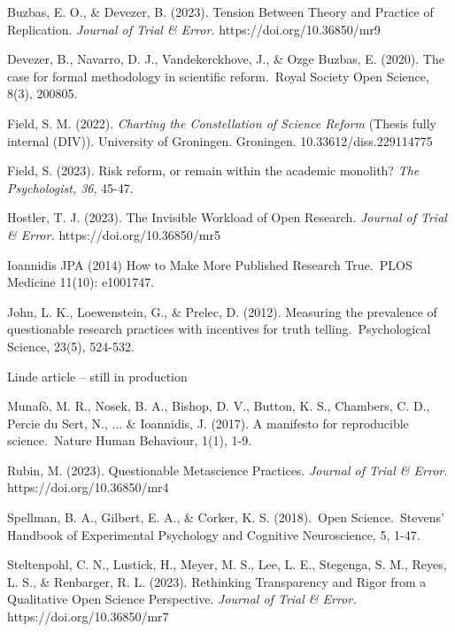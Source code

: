 \documentclass[authordate, editorial,noabstract]{jote-new-article}
\begin{document}
Buzbas, E. O., \& Devezer, B. (2023). Tension Between Theory and Practice of Replication. \emph{Journal of Trial \& Error.} https://doi.org/10.36850/mr9



Devezer, B., Navarro, D. J., Vandekerckhove, J., \& Ozge Buzbas, E. (2020). The case for formal methodology in scientific reform. Royal Society Open Science, 8(3), 200805.



Field, S. M. (2022). \emph{Charting the Constellation of Science Reform} (Thesis fully internal (DIV)). University of Groningen. Groningen. 10.33612/diss.229114775



Field, S. (2023). Risk reform, or remain within the academic monolith? \emph{The Psychologist, 36}, 45-47.



Hostler, T. J. (2023). The Invisible Workload of Open Research. \emph{Journal of Trial \& Error.} https://doi.org/10.36850/mr5



Ioannidis JPA (2014) How to Make More Published Research True. PLOS Medicine 11(10): e1001747.



John, L. K., Loewenstein, G., \& Prelec, D. (2012). Measuring the prevalence of questionable research practices with incentives for truth telling. Psychological Science, 23(5), 524-532.



Linde article -- still in production



Munafò, M. R., Nosek, B. A., Bishop, D. V., Button, K. S., Chambers, C. D., Percie du Sert, N., ... \& Ioannidis, J. (2017). A manifesto for reproducible science. Nature Human Behaviour, 1(1), 1-9.



Rubin, M. (2023). Questionable Metascience Practices. \emph{Journal of Trial \& Error.} https://doi.org/10.36850/mr4



Spellman, B. A., Gilbert, E. A., \& Corker, K. S. (2018). Open Science. Stevens' Handbook of Experimental Psychology and Cognitive Neuroscience, 5, 1-47.



Steltenpohl, C. N., Lustick, H., Meyer, M. S., Lee, L. E., Stegenga, S. M., Reyes, L. S., \& Renbarger, R. L. (2023). Rethinking Transparency and Rigor from a Qualitative Open Science Perspective. \emph{Journal of Trial \& Error.} https://doi.org/10.36850/mr7
\end{document}
